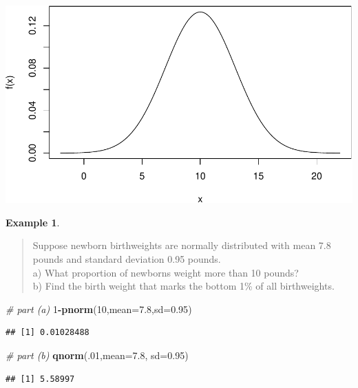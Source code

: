 \documentclass[
]{book}
\newenvironment{Shaded}{\begin{snugshade}}{\end{snugshade}}
\newcommand{\AttributeTok}[1]{\textcolor[rgb]{0.13,0.29,0.53}{#1}}
\newcommand{\CommentTok}[1]{\textcolor[rgb]{0.56,0.35,0.01}{\textit{#1}}}
\newcommand{\DecValTok}[1]{\textcolor[rgb]{0.00,0.00,0.81}{#1}}
\newcommand{\FloatTok}[1]{\textcolor[rgb]{0.00,0.00,0.81}{#1}}
\newcommand{\FunctionTok}[1]{\textcolor[rgb]{0.13,0.29,0.53}{\textbf{#1}}}
\newcommand{\NormalTok}[1]{#1}
\newcommand{\SpecialCharTok}[1]{\textcolor[rgb]{0.81,0.36,0.00}{\textbf{#1}}}
\theoremstyle{definition}
\theoremstyle{definition}
\newtheorem{example}{Example}[chapter]
\theoremstyle{definition}
\theoremstyle{definition}
\theoremstyle{remark}
\begin{document}
\includegraphics{math340-notes_files/figure-latex/unnamed-chunk-169-1.pdf}

\begin{example}
\protect\hypertarget{exm:normal-weights-R}{}\label{exm:normal-weights-R}\leavevmode

\begin{quote}
Suppose newborn birthweights are normally distributed with mean 7.8 pounds and standard deviation 0.95 pounds.\\
a) What proportion of newborns weight more than 10 pounds?\\
b) Find the birth weight that marks the bottom 1\% of all birthweights.
\end{quote}

\begin{Shaded}
\begin{Highlighting}[]
\CommentTok{\# part (a)}
\DecValTok{1}\SpecialCharTok{{-}}\FunctionTok{pnorm}\NormalTok{(}\DecValTok{10}\NormalTok{,}\AttributeTok{mean=}\FloatTok{7.8}\NormalTok{,}\AttributeTok{sd=}\FloatTok{0.95}\NormalTok{)}
\end{Highlighting}
\end{Shaded}

\begin{verbatim}
## [1] 0.01028488
\end{verbatim}

\begin{Shaded}
\begin{Highlighting}[]
\CommentTok{\# part (b)}
\FunctionTok{qnorm}\NormalTok{(.}\DecValTok{01}\NormalTok{,}\AttributeTok{mean=}\FloatTok{7.8}\NormalTok{, }\AttributeTok{sd=}\FloatTok{0.95}\NormalTok{)}
\end{Highlighting}
\end{Shaded}

\begin{verbatim}
## [1] 5.58997
\end{verbatim}

\end{example}
\end{document}
